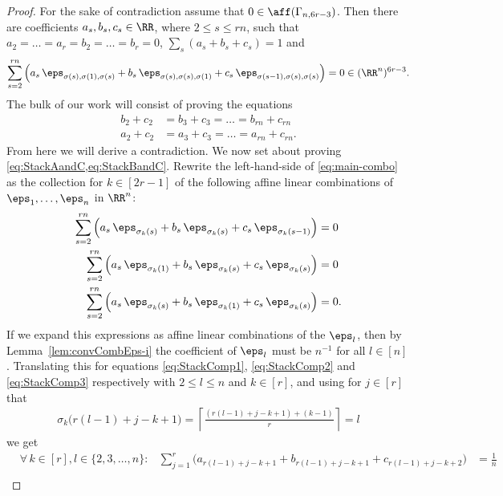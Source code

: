 \begin{proof}
For the sake of contradiction assume that $0 \in \aff(\Gamma_{n, 6 r - 3})$. Then there are coefficients $a_s, b_s, c_s \in \RR$, where $2 \leq s \leq r n$, such that $a_2 = \ldots = a_r = b_2 = \ldots = b_r = 0$, $\sum_s (a_s + b_s + c_s) = 1$ and
	\begin{align}
	\sum_{s= 2}^{r n} \left( a_s \, \eps_{\sigma(s),\sigma(1),\sigma(s)}
	+ b_s \, \eps_{\sigma(s),\sigma(s),\sigma(1)} + c_s \, \eps_{\sigma(s-1),\sigma(s),\sigma(s)}  \right) = 0 \in (\RR^n)^{6 r - 3}.\label{eq:main-combo}
	\end{align}
	The bulk of our work will consist of proving the equations
	\begin{align}\label{eq:StackBandC}
	b_2 + c_2 &= b_3 + c_3 = \ldots = b_{r n} + c_{r n}\\
	\label{eq:StackAandC} a_2 + c_2 &= a_3 + c_3 = \ldots = a_{r n} + c_{r n}.
	\end{align}
	From here we will derive a contradiction. We now set about proving \cref{eq:StackAandC,eq:StackBandC}. Rewrite the left-hand-side of \cref{eq:main-combo} as the collection for $k \in [2 r - 1]$ of the following affine linear combinations of $\eps_1,\ldots,\eps_n$ in $\RR^n$:
	\begin{align}
	\sum_{s= 2}^{r n} \left( a_s \, \eps_{\sigma_k(s)} 
	+ b_s \, \eps_{\sigma_k(s)} + c_s \, \eps_{\sigma_k(s-1)}  \right) &= 0 \label{eq:StackComp1}\\
	\sum_{s= 2}^{r n} \left( a_s \, \eps_{\sigma_k(1)}
	+ b_s \, \eps_{\sigma_k(s)} + c_s \, \eps_{\sigma_k(s)}  \right) &= 0 \label{eq:StackComp2} \\
	\sum_{s= 2}^{r n} \left( a_s \, \eps_{\sigma_k(s)}
	+ b_s \, \eps_{\sigma_k(1)} + c_s \, \eps_{\sigma_k(s)}  \right) &= 0. \label{eq:StackComp3}
	\end{align}
If we expand this expressions as affine linear combinations of the $\eps_l$, then by Lemma~\ref{lem:convCombEps-i} the coefficient of $\eps_l$ must be $n^{-1}$ for all $l \in [n]$. Translating this for equations \eqref{eq:StackComp1}, \eqref{eq:StackComp2} and \eqref{eq:StackComp3} respectively with $2 \leq l \leq n$ and $k \in [r]$, and using for $j \in [r]$ that
	\begin{align}
	\sigma_{k} \big(r(l-1)+j - k + 1 \big) = \left\lceil \frac{(r(l-1)+j - k + 1) + (k-1)}{r} \right\rceil = l \label{eq:sigma-inverse}
	\end{align}
we get
	\begin{align}
	&\forall \, k \in [r], l \in \{2,3,\ldots,n\} \colon  &\sum_{j=1}^r \big( a_{r(l-1)+j - k + 1} + b_{r(l-1)+j - k + 1} + c_{r(l-1)+j- k + 2} \big) &= \frac{1}{n} \label{eq:Coeff1} \\

\end{align}
\end{proof}
